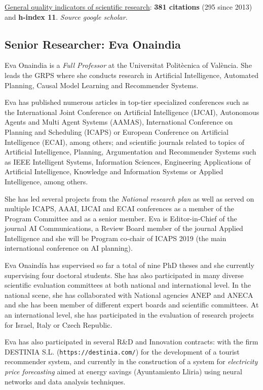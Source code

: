 \documentclass[10pt,a4paper]{paper}
\begin{document}
\underline{General quality indicators of scientific research}: {\bf 381 citations} (295 since 2013) and {\bf h-index 11}. {\scriptsize\em Source google scholar}.


\subsection{Senior Researcher: Eva Onaindia}
Eva Onaindia is a {\em Full Professor} at the Universitat Politècnica of València. She leads the GRPS where she conducts research in Artificial Intelligence, Automated Planning, Causal Model Learning and Recommender Systems.

Eva has published numerous articles in top-tier specialized conferences such as the International Joint Conference on Artificial Intelligence (IJCAI), Autonomous Agents and Multi Agent Systems (AAMAS), International Conference on Planning and Scheduling (ICAPS) or European Conference on Artificial Intelligence (ECAI), among others; and scientific journals related to topics of Artificial Intelligence, Planning, Argumentation and Recommender Systems such as IEEE Intelligent Systems, Information Sciences, Engineering Applications of Artificial Intelligence, Knowledge and Information Systems or Applied Intelligence, among others.

She has led several projects from the {\em National research plan} as well as served on multiple ICAPS, AAAI, IJCAI and ECAI conferences as a member of the Program Committee and as a senior member. Eva is Editor-in-Chief of the journal AI Communications, a Review Board member of the journal Applied Intelligence and she will be Program co-chair of ICAPS 2019 (the main international conference on AI planning). 

Eva Onaindía has supervised so far a total of nine PhD theses and she currently supervising four doctoral students. She has also participated in many diverse scientific evaluation committees at both national and international level. In the national scene, she has collaborated with National agencies ANEP and ANECA and she has been member of different expert boards and scientific committees. At an international level, she has participated in the evaluation of research projects for Israel, Italy or Czech Republic.

Eva has also participated in several R\&D and Innovation contracts: with the firm {\sc DESTINIA S.L.} ({\tt https://destinia.com/}) for the development of a tourist recommender system, and currently in the construction of a system for {\em electricity price forecasting} aimed at energy savings (Ayuntamiento Lliria) using neural networks and data analysis techniques.
\end{document}

